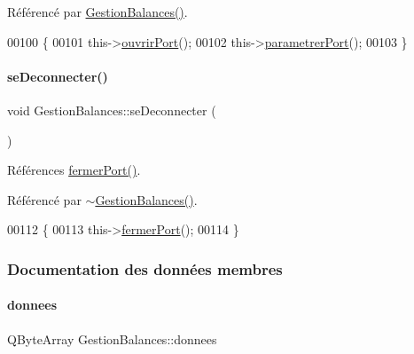 Référencé par \hyperlink{class_gestion_balances_a68f1e2d248971ff912f4ce5e2a24b6ef}{Gestion\+Balances()}.


\begin{DoxyCode}
00100 \{
00101     this->\hyperlink{class_gestion_balances_a8d7031310e6b9530c0a9e47c142aaf39}{ouvrirPort}();
00102     this->\hyperlink{class_gestion_balances_aca48b0074aaef7b8d4d9da45c3d6a3a9}{parametrerPort}();
00103 \}
\end{DoxyCode}
\mbox{\label{class_gestion_balances_a25880f41779aa8fdeac7ae972b09ff36}} 
\paragraph{\texorpdfstring{se\+Deconnecter()}{seDeconnecter()}}
{\footnotesize\ttfamily void Gestion\+Balances\+::se\+Deconnecter (\begin{DoxyParamCaption}{ }\end{DoxyParamCaption})}



Références \hyperlink{class_gestion_balances_a4c59a33f55b0c97f0ea4fb63b7791c0c}{fermer\+Port()}.



Référencé par \hyperlink{class_gestion_balances_a6cb93817424cba3ac1f1593f5948d2ee}{$\sim$\+Gestion\+Balances()}.


\begin{DoxyCode}
00112 \{
00113     this->\hyperlink{class_gestion_balances_a4c59a33f55b0c97f0ea4fb63b7791c0c}{fermerPort}();
00114 \}
\end{DoxyCode}


\subsubsection{Documentation des données membres}
\mbox{\label{class_gestion_balances_acb44214ef5e441e89e0525f567079af3}} 
\paragraph{\texorpdfstring{donnees}{donnees}}
{\footnotesize\ttfamily Q\+Byte\+Array Gestion\+Balances\+::donnees\hspace{0.3cm}{\ttfamily [private]}}




